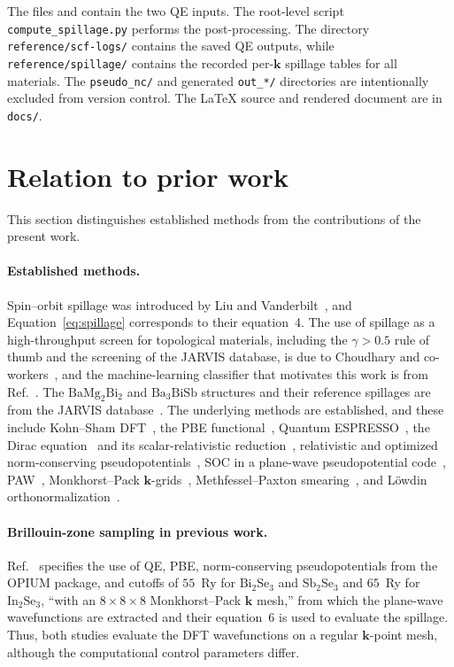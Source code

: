 \documentclass[11pt]{article}
\newcommand{\kk}{\mathbf{k}}
\newcommand{\bmb}{\mathrm{BaMg_2Bi_2}}
\newcommand{\bath}{\mathrm{Ba_3BiSb}}
\begin{document}
\begin{sloppypar}
\noindent The files  and
 contain the two QE inputs. The root-level script
\texttt{compute\_spillage.py} performs the post-processing. The directory
\texttt{reference/scf-logs/} contains the saved QE outputs, while
\texttt{reference/spillage/} contains the recorded per-$\kk$ spillage tables for all materials.
The \texttt{pseudo\_nc/} and generated \texttt{out\_*/} directories are intentionally excluded from
version control. The LaTeX source and rendered document are in \texttt{docs/}.
\end{sloppypar}

\section{Relation to prior work}\label{sec:prior}

This section distinguishes established methods from the contributions of the present
work.

\paragraph{Established methods.} Spin--orbit spillage was introduced by Liu and
Vanderbilt~\cite{liu2014}, and Equation~\eqref{eq:spillage} corresponds to their equation~4. The use
of spillage as a high-throughput screen for topological materials, including the $\gamma>0.5$ rule
of thumb and the screening of the
JARVIS database, is due to Choudhary and
co-workers~\cite{choudhary2019,choudhary2020npj,choudhary2021}, and the machine-learning classifier
that motivates this work is from Ref.~\cite{choudhary2021}. The $\bmb$ and $\bath$ structures and
their reference spillages are from the JARVIS database~\cite{choudhary2019,choudhary2020}. The
underlying methods are established, and these include Kohn--Sham DFT~\cite{hohenberg1964,kohn1965}, the PBE
functional~\cite{perdew1996}, Quantum ESPRESSO~\cite{giannozzi2009,giannozzi2017}, the Dirac
equation~\cite{dirac1928} and its scalar-relativistic reduction~\cite{koelling1977}, relativistic and
optimized norm-conserving pseudopotentials~\cite{bachelet1982,kleinman1980,hamann2013,vansetten2018},
SOC in a plane-wave pseudopotential code~\cite{dalcorso2005}, PAW~\cite{blochl1994},
Monkhorst--Pack $\kk$-grids~\cite{monkhorst1976}, Methfessel--Paxton smearing~\cite{methfessel1989}, and L\"owdin
orthonormalization~\cite{lowdin1950}.

\paragraph{Brillouin-zone sampling in previous work.} Ref.~\cite{liu2014} specifies
the use of QE, PBE, norm-conserving pseudopotentials from the OPIUM package, and cutoffs of
$55$~Ry for $\mathrm{Bi_2Se_3}$ and $\mathrm{Sb_2Se_3}$ and $65$~Ry for $\mathrm{In_2Se_3}$, ``with an
$8\times8\times8$ Monkhorst--Pack $\kk$ mesh,'' from which the plane-wave wavefunctions are extracted
and their equation~6 is used to evaluate the spillage. Thus, both studies evaluate the DFT
wavefunctions on a regular $\kk$-point mesh, although the computational control parameters differ.
\end{document}
